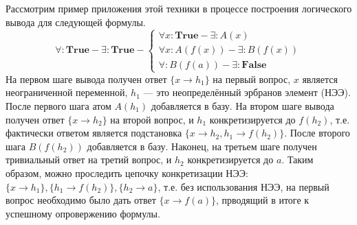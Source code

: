 Рассмотрим пример приложения этой техники в процессе построения логического вывода для следующей формулы.
\begin{equation*}
	\forall\colon\boldsymbol{True} - \exists\colon\boldsymbol{True} -
	\left\lbrace
	\begin{array}{l}
		\forall x\colon\boldsymbol{True} - \exists\colon A(x) \\
		\forall x\colon A(f(x)) - \exists\colon B(f(x)) \\
		\forall\colon B(f(a)) - \exists\colon \boldsymbol{False}
	\end{array}\right.
\end{equation*}
На первом шаге вывода получен ответ $\{x \rightarrow h_1\}$ на первый вопрос, $x$ является неограниченной переменной, $h_1$ --- это неопределённый эрбранов элемент (НЭЭ). После первого шага атом $A(h_1)$ добавляется в базу. На втором шаге вывода получен ответ $\{x \rightarrow h_2\}$ на второй вопрос, и $h_1$ конкретизируется до $f(h_2)$, т.е. фактически ответом является подстановка $\{x \rightarrow h_2, h_1 \rightarrow f(h_2)\}$. После второго шага $B(f(h_2))$ добавляется в базу. Наконец, на третьем шаге получен тривиальный ответ на третий вопрос, и $h_2$ конкретизируется до $a$. Таким образом, можно проследить цепочку конкретизации НЭЭ: $\{x \rightarrow h_1\}, \{h_1 \rightarrow f(h_2)\}, \{h_2 \rightarrow a\}$, т.е. без использования НЭЭ, на первый вопрос необходимо было дать ответ $\{x \rightarrow f(a)\}$, прводящий в итоге к успешному опровержению формулы.

